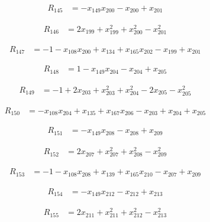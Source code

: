 \begin{align*}
R_{145} &= -x_{149} x_{200} -x_{200} +x_{201}
\end{align*}

\begin{align*}
R_{146} &= 2 x_{199} +x_{199}^{2} +x_{200}^{2} -x_{201}^{2}
\end{align*}

\begin{align*}
R_{147} &= -1 -x_{108} x_{200} +x_{134} +x_{165} x_{202} -x_{199} +x_{201}
\end{align*}

\begin{align*}
R_{148} &= 1 -x_{149} x_{204} -x_{204} +x_{205}
\end{align*}

\begin{align*}
R_{149} &= -1 +2 x_{203} +x_{203}^{2} +x_{204}^{2} -2 x_{205} -x_{205}^{2}
\end{align*}

\begin{align*}
R_{150} &= -x_{108} x_{204} +x_{135} +x_{167} x_{206} -x_{203} +x_{204} +x_{205}
\end{align*}

\begin{align*}
R_{151} &= -x_{149} x_{208} -x_{208} +x_{209}
\end{align*}

\begin{align*}
R_{152} &= 2 x_{207} +x_{207}^{2} +x_{208}^{2} -x_{209}^{2}
\end{align*}

\begin{align*}
R_{153} &= -1 -x_{108} x_{208} +x_{139} +x_{165} x_{210} -x_{207} +x_{209}
\end{align*}

\begin{align*}
R_{154} &= -x_{149} x_{212} -x_{212} +x_{213}
\end{align*}

\begin{align*}
R_{155} &= 2 x_{211} +x_{211}^{2} +x_{212}^{2} -x_{213}^{2}
\end{align*}

